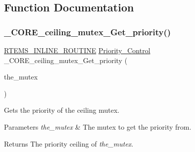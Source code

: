 \subsection{Function Documentation}
\mbox{\label{group__RTEMSScoreMutex_gaba91517faca7018478e83a8ace073303}} 
\subsubsection{\texorpdfstring{\_CORE\_ceiling\_mutex\_Get\_priority()}{\_CORE\_ceiling\_mutex\_Get\_priority()}}
{\footnotesize\ttfamily \mbox{\hyperlink{group__RTEMSScoreBaseDefs_gac216239df231d5dbd15e3520b0b9313f}{R\+T\+E\+M\+S\+\_\+\+I\+N\+L\+I\+N\+E\+\_\+\+R\+O\+U\+T\+I\+NE}} \mbox{\hyperlink{group__RTEMSScorePriority_ga59d02b58072d31a9a1cfe644557aefe2}{Priority\+\_\+\+Control}} \+\_\+\+C\+O\+R\+E\+\_\+ceiling\+\_\+mutex\+\_\+\+Get\+\_\+priority (\begin{DoxyParamCaption}\item[{const \mbox{\hyperlink{structCORE__ceiling__mutex__Control}{C\+O\+R\+E\+\_\+ceiling\+\_\+mutex\+\_\+\+Control}} $\ast$}]{the\+\_\+mutex }\end{DoxyParamCaption})}



Gets the priority of the ceiling mutex. 


\begin{DoxyParams}{Parameters}
{\em the\+\_\+mutex} & The mutex to get the priority from.\\
\hline
\end{DoxyParams}
\begin{DoxyReturn}{Returns}
The priority ceiling of {\itshape the\+\_\+mutex}. 
\end{DoxyReturn}
\mbox{\label{group__RTEMSScoreMutex_gac9a59aa3067426552a8180c362ffcf3c}} 
